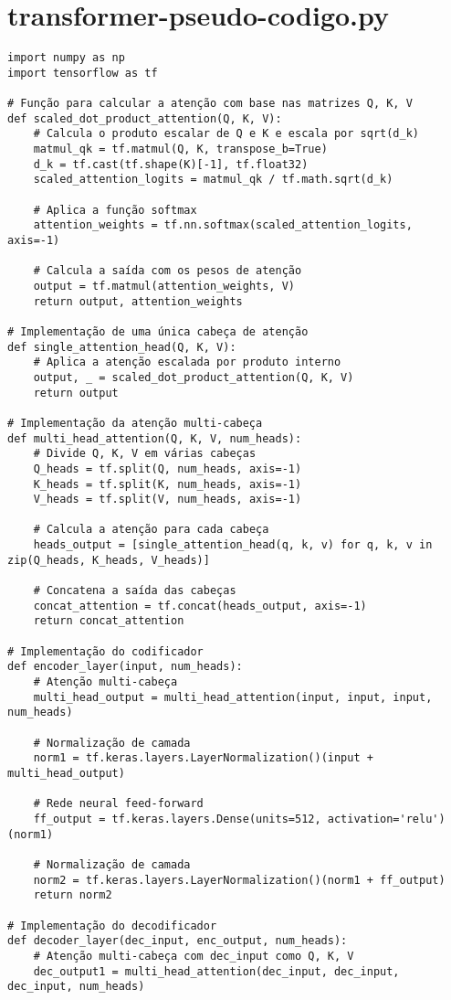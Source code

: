 \chapter{transformer-pseudo-codigo.py}
\label{appendix:a}
\begin{lstlisting}
import numpy as np
import tensorflow as tf

# Função para calcular a atenção com base nas matrizes Q, K, V
def scaled_dot_product_attention(Q, K, V):
    # Calcula o produto escalar de Q e K e escala por sqrt(d_k)
    matmul_qk = tf.matmul(Q, K, transpose_b=True)
    d_k = tf.cast(tf.shape(K)[-1], tf.float32)
    scaled_attention_logits = matmul_qk / tf.math.sqrt(d_k)

    # Aplica a função softmax
    attention_weights = tf.nn.softmax(scaled_attention_logits, axis=-1)

    # Calcula a saída com os pesos de atenção
    output = tf.matmul(attention_weights, V)
    return output, attention_weights

# Implementação de uma única cabeça de atenção
def single_attention_head(Q, K, V):
    # Aplica a atenção escalada por produto interno
    output, _ = scaled_dot_product_attention(Q, K, V)
    return output

# Implementação da atenção multi-cabeça
def multi_head_attention(Q, K, V, num_heads):
    # Divide Q, K, V em várias cabeças
    Q_heads = tf.split(Q, num_heads, axis=-1)
    K_heads = tf.split(K, num_heads, axis=-1)
    V_heads = tf.split(V, num_heads, axis=-1)

    # Calcula a atenção para cada cabeça
    heads_output = [single_attention_head(q, k, v) for q, k, v in zip(Q_heads, K_heads, V_heads)]

    # Concatena a saída das cabeças
    concat_attention = tf.concat(heads_output, axis=-1)
    return concat_attention

# Implementação do codificador
def encoder_layer(input, num_heads):
    # Atenção multi-cabeça
    multi_head_output = multi_head_attention(input, input, input, num_heads)

    # Normalização de camada
    norm1 = tf.keras.layers.LayerNormalization()(input + multi_head_output)

    # Rede neural feed-forward
    ff_output = tf.keras.layers.Dense(units=512, activation='relu')(norm1)

    # Normalização de camada
    norm2 = tf.keras.layers.LayerNormalization()(norm1 + ff_output)
    return norm2

# Implementação do decodificador
def decoder_layer(dec_input, enc_output, num_heads):
    # Atenção multi-cabeça com dec_input como Q, K, V
    dec_output1 = multi_head_attention(dec_input, dec_input, dec_input, num_heads)


\end{lstlisting}
